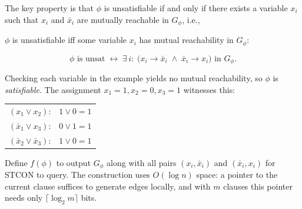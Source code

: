 \documentclass[12pt,a4paper,openany]{article}
\begin{document}
The key property is that $\phi$ is unsatisfiable if and only if there exists a variable $x_i$ such that $x_i$ and $\bar{x}_i$ are mutually reachable in $G_\phi$, i.e.,

$\phi$ is unsatisfiable iff some variable $x_i$ has mutual reachability in $G_\phi$:

\[
\phi \text{ is unsat}
\;\leftrightarrow\;
\exists\, i:\;
\big(x_i \to \bar{x}_i \;\wedge\; \bar{x}_i \to x_i\big) \text{ in } G_\phi.
\]

Checking each variable in the example yields no mutual reachability, so $\phi$ is
\emph{satisfiable}. The assignment $x_1=1, x_2=0, x_3=1$ witnesses this:

\begin{center}
\begin{tabular}{ll}
$(x_1 \vee x_2)$:             & $1 \vee 0 = 1$ \\
$(\bar{x}_1 \vee x_3)$:       & $0 \vee 1 = 1$ \\
$(\bar{x}_2 \vee \bar{x}_3)$: & $1 \vee 0 = 1$ \\
\end{tabular}
\end{center}

Define $f(\phi)$ to output $G_\phi$ along with all pairs $(x_i, \bar{x}_i)$ and
$(\bar{x}_i, x_i)$ for \textsc{STCON} to query. The construction uses $O(\log n)$
space: a pointer to the current clause suffices to generate edges locally, and
with $m$ clauses this pointer needs only $\lceil \log_2 m \rceil$ bits.
\end{document}
